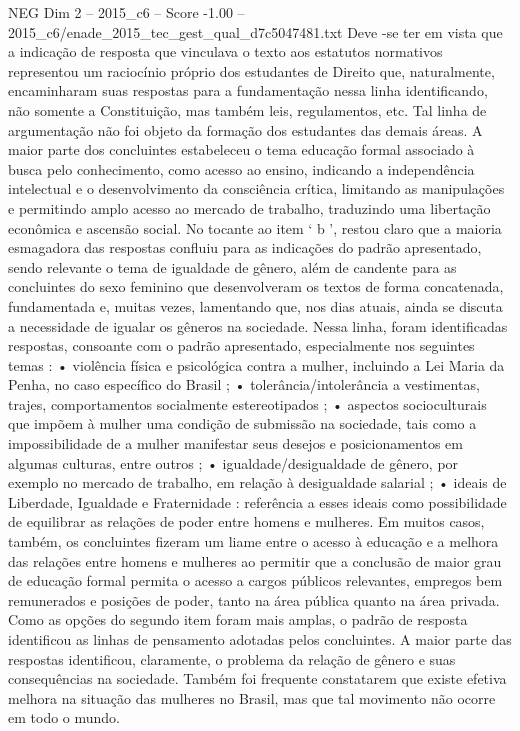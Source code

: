 \begin{textsample}{NEG Dim 2 – 2015\_c6 – Score -1.00 – 2015\_c6/enade\_2015\_tec\_gest\_qual\_d7c5047481.txt}
Deve -se ter em vista que a indicação de resposta que vinculava o texto aos estatutos normativos representou um raciocínio próprio dos estudantes de Direito que, naturalmente, encaminharam suas respostas para a fundamentação nessa linha identificando, não somente a Constituição, mas também leis, regulamentos, etc.
Tal linha de argumentação não foi objeto da formação dos estudantes das demais áreas.
A maior parte dos concluintes estabeleceu o tema educação formal associado à busca pelo conhecimento, como acesso ao ensino, indicando a independência intelectual e o desenvolvimento da consciência crítica, limitando as manipulações e permitindo amplo acesso ao mercado de trabalho, traduzindo uma libertação econômica e ascensão social.
No tocante ao item ‘ b ’, restou claro que a maioria esmagadora das respostas confluiu para as indicações do padrão apresentado, sendo relevante o tema de igualdade de gênero, além de candente para as concluintes do sexo feminino que desenvolveram os textos de forma concatenada, fundamentada e, muitas vezes, lamentando que, nos dias atuais, ainda se discuta a necessidade de igualar os gêneros na sociedade.
Nessa linha, foram identificadas respostas, consoante com o padrão apresentado, especialmente nos seguintes temas : • violência física e psicológica contra a mulher, incluindo a Lei Maria da Penha, no caso específico do Brasil ; • tolerância/intolerância a vestimentas, trajes, comportamentos socialmente estereotipados ; • aspectos socioculturais que impõem à mulher uma condição de submissão na sociedade, tais como a impossibilidade de a mulher manifestar seus desejos e posicionamentos em algumas culturas, entre outros ; • igualdade/desigualdade de gênero, por exemplo no mercado de trabalho, em relação à desigualdade salarial ; • ideais de Liberdade, Igualdade e Fraternidade : referência a esses ideais como possibilidade de equilibrar as relações de poder entre homens e mulheres.
Em muitos casos, também, os concluintes fizeram um liame entre o acesso à educação e a melhora das relações entre homens e mulheres ao permitir que a conclusão de maior grau de educação formal permita o acesso a cargos públicos relevantes, empregos bem remunerados e posições de poder, tanto na área pública quanto na área privada.
Como as opções do segundo item foram mais amplas, o padrão de resposta identificou as linhas de pensamento adotadas pelos concluintes.
A maior parte das respostas identificou, claramente, o problema da relação de gênero e suas consequências na sociedade.
Também foi frequente constatarem que existe efetiva melhora na situação das mulheres no Brasil, mas que tal movimento não ocorre em todo o mundo.

\end{textsample}
